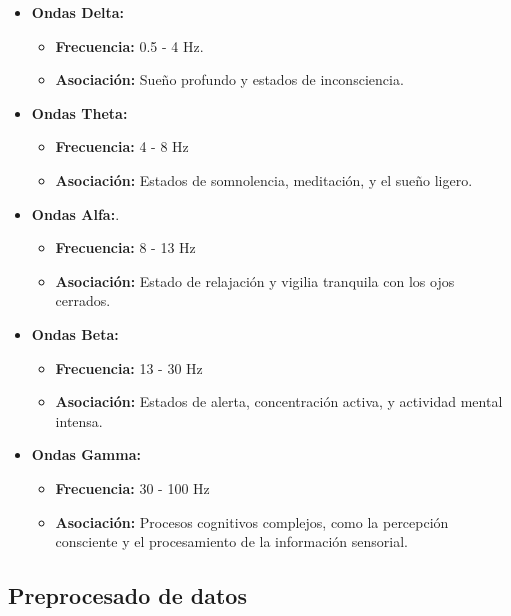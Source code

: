 \begin{itemize}

	\item
	\textbf{Ondas Delta:} 	
	\begin{itemize}
	
	\item
	\textbf{Frecuencia:} 0.5 - 4 Hz.
	\item 
	\textbf{Asociación:} Sueño profundo y estados de inconsciencia.
	\end{itemize}
	
	\item
	\textbf{Ondas Theta:}
	\begin{itemize}
	
	\item
	\textbf{Frecuencia:} 4 - 8 Hz
	\item 
	\textbf{Asociación:} Estados de somnolencia, meditación, y el sueño ligero.
	\end{itemize}
	
	\item
	\textbf{Ondas Alfa:}.
	\begin{itemize}
	
	\item
	\textbf{Frecuencia:} 8 - 13 Hz
	\item 
	\textbf{Asociación:} Estado de relajación y vigilia tranquila con los ojos cerrados.
	\end{itemize}

	\item
	\textbf{Ondas Beta:}
	\begin{itemize}
	
	\item
	\textbf{Frecuencia:} 13 - 30 Hz
	\item 
	\textbf{Asociación:} Estados de alerta, concentración activa, y actividad mental intensa.
	\end{itemize}
	
	\item
	\textbf{Ondas Gamma:}
	\begin{itemize}
	
	\item
	\textbf{Frecuencia:} 30 - 100 Hz
	\item 
	\textbf{Asociación:} Procesos cognitivos complejos, como la percepción consciente y el procesamiento de la información sensorial.
	\end{itemize}
\end{itemize}


\subsection{Preprocesado de datos}


